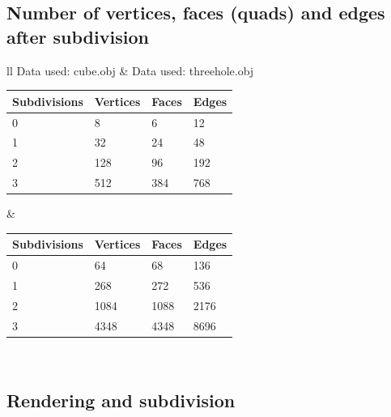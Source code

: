 \documentclass[12pt,a4paper]{scrartcl}
\begin{document}
\subsection{Number of vertices, faces (quads) and edges after subdivision}

\begin{tabular}{ll}
	Data used: cube.obj & Data used: threehole.obj \\
	\begin{tabular}{|l|l|l|l|}
		\hline
		Subdivisions & Vertices & Faces & Edges \\
		\hline
		0 & 8 & 6 & 12 \\
		\hline
		1 & 32 & 24 & 48 \\
		\hline
		2 & 128 & 96 & 192 \\
		\hline
		3 & 512 & 384 & 768 \\
		\hline
	\end{tabular}
	&
	\begin{tabular}{|l|l|l|l|}
		\hline
		Subdivisions & Vertices & Faces & Edges \\
		\hline
		0 & 64 & 68 & 136 \\
		\hline
		1 & 268 & 272 & 536 \\
		\hline
		2 & 1084 & 1088 & 2176 \\
		\hline
		3 & 4348 & 4348 & 8696 \\
		\hline
	\end{tabular}
	\\
\end{tabular}


\subsection{Rendering and subdivision}
\end{document}
